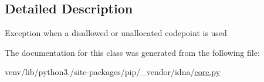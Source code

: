 \subsection{Detailed Description}
\begin{DoxyVerb}Exception when a disallowed or unallocated codepoint is used \end{DoxyVerb}
 

The documentation for this class was generated from the following file\+:\begin{DoxyCompactItemize}
\item 
venv/lib/python3./site-\/packages/pip/\+\_\+vendor/idna/\hyperlink{pip_2__vendor_2idna_2core_8py}{core.\+py}\end{DoxyCompactItemize}
